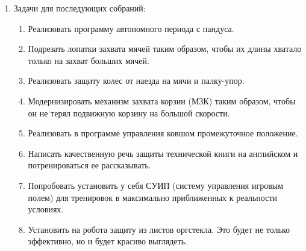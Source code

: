 \begin{enumerate}
\begin{enumerate}
  \end{enumerate}
  
  \item Задачи для последующих собраний:
  \begin{enumerate}
  	\item Реализовать программу автономного периода с пандуса.
  	
  	\item Подрезать лопатки захвата мячей таким образом, чтобы их длины хватало только на захват больших мячей.
  	
  	\item Реализовать защиту колес от наезда на мячи и палку-упор.
  	
  	\item Модернизировать механизм захвата корзин (МЗК) таким образом, чтобы он не терял подвижную корзину на большой скорости.
  	
  	\item Реализовать в программе управления ковшом промежуточное положение.
  	
  	\item Написать качественную речь защиты технической книги на английском и потренироваться ее рассказывать.
  	  	
  	\item Попробовать установить у себя СУИП (систему управления игровым полем) для тренировок в максимально приближенных к реальности условиях.
  	
  	\item Установить на робота защиту из листов оргстекла. Это будет не только эффективно, но и будет красиво выглядеть.
  	
  \end{enumerate}
  
\end{enumerate}
\fillpage
